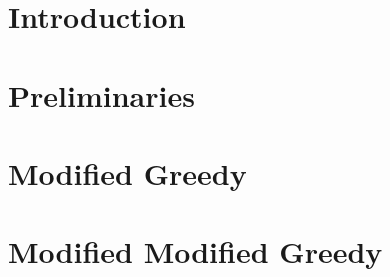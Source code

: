 \begin{abstract}

\end{abstract}

\section{Introduction}


\section{Preliminaries}


\section{Modified Greedy}


\section{Modified Modified Greedy}


